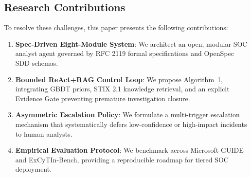 \subsection{Research Contributions}
To resolve these challenges, this paper presents the following contributions:
\begin{enumerate}
    \item \textbf{Spec-Driven Eight-Module System}: We architect an open, modular SOC analyst agent governed by RFC 2119 formal specifications and OpenSpec SDD schemas.
    \item \textbf{Bounded ReAct+RAG Control Loop}: We propose Algorithm~1, integrating GBDT priors, STIX 2.1 knowledge retrieval, and an explicit Evidence Gate preventing premature investigation closure.
    \item \textbf{Asymmetric Escalation Policy}: We formulate a multi-trigger escalation mechanism that systematically defers low-confidence or high-impact incidents to human analysts.
    \item \textbf{Empirical Evaluation Protocol}: We benchmark across Microsoft GUIDE and ExCyTIn-Bench, providing a reproducible roadmap for tiered SOC deployment.
\end{enumerate}
